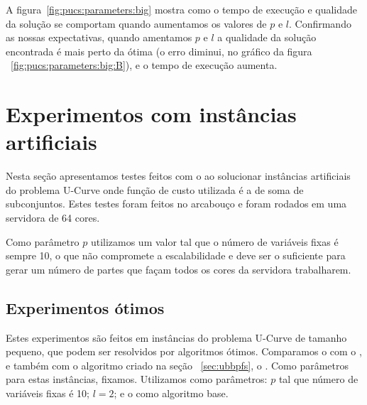 A figura~\ref{fig:pucs:parameters:big} mostra como o tempo de execução
e qualidade da solução se comportam quando aumentamos os valores de 
$p$ e $l$. Confirmando as nossas expectativas, quando amentamos $p$ e
$l$ a qualidade da solução encontrada é mais perto da ótima (o erro 
diminui, no gráfico da figura ~\ref{fig:pucs:parameters:big:B}), e o 
tempo de execução aumenta.

\section{Experimentos com instâncias artificiais}
Nesta seção apresentamos testes feitos com o  ao  
solucionar instâncias artificiais do problema U-Curve onde função de 
custo utilizada é a de soma de subconjuntos. Estes testes foram feitos
no arcabouço  e foram rodados em uma servidora de 
64 cores.

Como parâmetro $p$ utilizamos um valor tal que o número de variáveis
fixas é sempre 10, o que não compromete a escalabilidade e deve ser 
o suficiente para gerar um número de partes que façam todos os cores
da servidora trabalharem.

\subsection{Experimentos ótimos}
Estes experimentos são feitos em instâncias do problema U-Curve de 
tamanho pequeno, que podem ser resolvidos por algoritmos ótimos. 
Comparamos o  com o ,  e
também com o algoritmo criado na seção ~\ref{sec:ubbpfs}, o 
. Como parâmetros para estas instâncias, fixamos. 
Utilizamos como parâmetros: $p$ tal que número de variáveis fixas é 10;
$l = 2$; e o  como algoritmo base.

